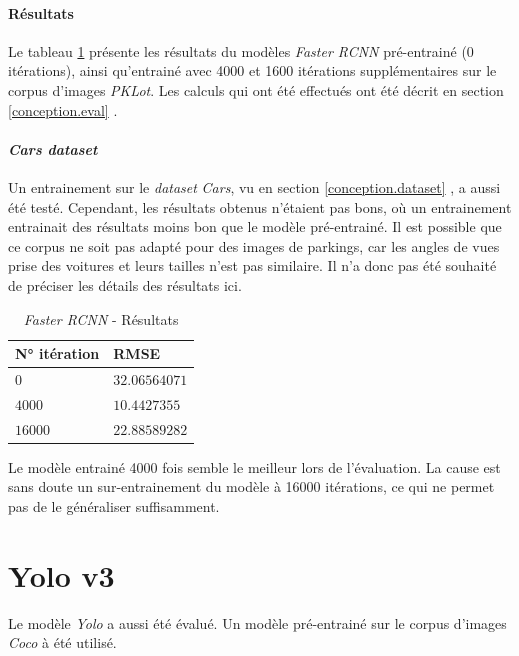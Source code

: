 \paragraph{Résultats}

Le tableau \ref{tab:rcnn_results} présente les résultats du modèles \textit{Faster RCNN} pré-entrainé (0 itérations), ainsi qu'entrainé avec 4000 et 1600 itérations supplémentaires sur le corpus d'images \textit{PKLot}. Les calculs qui ont été effectués ont été décrit en section \ref{conception.eval} .

\paragraph{\textit{Cars dataset}}

Un entrainement sur le \textit{dataset} \textit{Cars}, vu en section \ref{conception.dataset} , a aussi été testé. Cependant, les résultats obtenus n'étaient pas bons, où un entrainement entrainait des résultats moins bon que le modèle pré-entrainé. Il est possible que ce corpus ne soit pas adapté pour des images de parkings, car les angles de vues prise des voitures et leurs tailles n'est pas similaire. Il n'a donc pas été souhaité de préciser les détails des résultats ici.

\begin{table}[ht]
\centering
\begin{tabular}{@{}ll@{}}
\toprule
N° itération & RMSE \\ \midrule
$0$            & $32.06564071$ \\
$4000$         & $10.4427355$ \\
$16000$        & $22.88589282$ \\ \bottomrule
\end{tabular}
\caption{\textit{Faster RCNN} - Résultats}
\label{tab:rcnn_results}
\end{table}

Le modèle entrainé 4000 fois semble le meilleur lors de l'évaluation. La cause est sans doute un sur-entrainement du modèle à 16000 itérations, ce qui ne permet pas de le généraliser suffisamment.

\section{Yolo v3}

Le modèle \textit{Yolo} a aussi été évalué. Un modèle pré-entrainé sur le corpus d'images \textit{Coco}\autocite{data:coco} à été utilisé.

